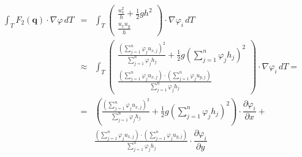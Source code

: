 \documentclass{article}
\newcommand{\pd}[2]{\dfrac{\partial #1}{\partial #2}}
\renewcommand{\phi}{\varphi}
\begin{document}
\begin{eqnarray*}
  \int_T F_2\left(\mathbf{q}\right) \cdot \nabla \phi \, dT & = &
  \int_T
  \begin{pmatrix}
    \frac{u_x^2}{h} + \frac{1}{2} g h^2 \\ \frac{u_x u_y}{h}
  \end{pmatrix}
  \cdot \nabla \phi_i \, dT \\
  & \approx & \int_T
  \begin{pmatrix}
    \frac{(\sum_{j=1}^n \phi_j u_{x,j})^2}{\sum_{j=1}^n \phi_j h_j} + \frac{1}{2} g (\sum_{j=1}^n \phi_j h_j)^2 \\
    \frac{(\sum_{j=1}^n \phi_j u_{x,j}) \cdot (\sum_{j=1}^n \phi_j u_{y,j})}{\sum_{j=1}^n \phi_j h_j}
  \end{pmatrix}
  \cdot \nabla \phi_i \, dT = \\
  & = &
   \left( \frac{(\sum_{j=1}^n \phi_j u_{x,j})^2}{\sum_{j=1}^n \phi_j h_j} + \frac{1}{2} g (\sum_{j=1}^n \phi_j h_j)^2 \right) \cdot \pd{\phi_i}{x} + \\
  & & \frac{(\sum_{j=1}^n \phi_j u_{x,j}) \cdot (\sum_{j=1}^n \phi_j u_{y,j})}{\sum_{j=1}^n \phi_j h_j} \cdot \pd{\phi_i}{y}
\end{eqnarray*}

\end{document}

